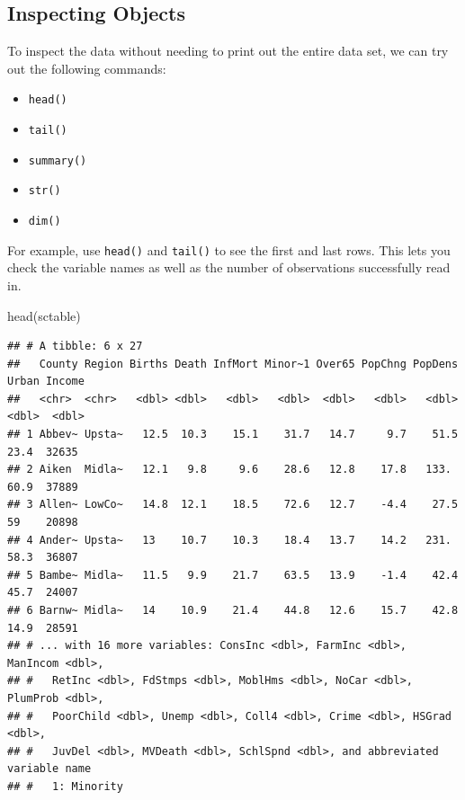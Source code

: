 \documentclass[
]{book}
\newenvironment{Shaded}{\begin{snugshade}}{\end{snugshade}}
\newcommand{\FunctionTok}[1]{\textcolor[rgb]{0.00,0.00,0.00}{#1}}
\newcommand{\NormalTok}[1]{#1}
\providecommand{\tightlist}{%
  \setlength{\itemsep}{0pt}\setlength{\parskip}{0pt}}
\begin{document}
\hypertarget{inspecting-objects}{%
\subsection*{Inspecting Objects}\label{inspecting-objects}}

To inspect the data without needing to print out the entire data set, we can try out the following commands:

\begin{itemize}
\tightlist
\item
  \texttt{head()}
\item
  \texttt{tail()}
\item
  \texttt{summary()}
\item
  \texttt{str()}
\item
  \texttt{dim()}
\end{itemize}

For example, use \texttt{head()} and \texttt{tail()} to see the first and last rows. This lets you check the variable names as well as the number of observations successfully read in.

\begin{Shaded}
\begin{Highlighting}[]
\FunctionTok{head}\NormalTok{(sctable)}
\end{Highlighting}
\end{Shaded}

\begin{verbatim}
## # A tibble: 6 x 27
##   County Region Births Death InfMort Minor~1 Over65 PopChng PopDens Urban Income
##   <chr>  <chr>   <dbl> <dbl>   <dbl>   <dbl>  <dbl>   <dbl>   <dbl> <dbl>  <dbl>
## 1 Abbev~ Upsta~   12.5  10.3    15.1    31.7   14.7     9.7    51.5  23.4  32635
## 2 Aiken  Midla~   12.1   9.8     9.6    28.6   12.8    17.8   133.   60.9  37889
## 3 Allen~ LowCo~   14.8  12.1    18.5    72.6   12.7    -4.4    27.5  59    20898
## 4 Ander~ Upsta~   13    10.7    10.3    18.4   13.7    14.2   231.   58.3  36807
## 5 Bambe~ Midla~   11.5   9.9    21.7    63.5   13.9    -1.4    42.4  45.7  24007
## 6 Barnw~ Midla~   14    10.9    21.4    44.8   12.6    15.7    42.8  14.9  28591
## # ... with 16 more variables: ConsInc <dbl>, FarmInc <dbl>, ManIncom <dbl>,
## #   RetInc <dbl>, FdStmps <dbl>, MoblHms <dbl>, NoCar <dbl>, PlumProb <dbl>,
## #   PoorChild <dbl>, Unemp <dbl>, Coll4 <dbl>, Crime <dbl>, HSGrad <dbl>,
## #   JuvDel <dbl>, MVDeath <dbl>, SchlSpnd <dbl>, and abbreviated variable name
## #   1: Minority
\end{verbatim}
\end{document}
